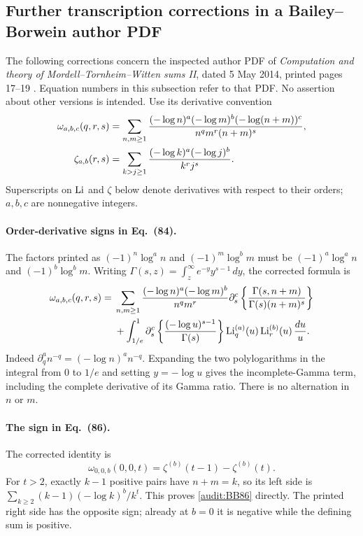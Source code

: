\subsection{Further transcription corrections in a Bailey--Borwein author PDF}
\label{audit:BB2014}

The following corrections concern the inspected author PDF of
\emph{Computation and theory of Mordell--Tornheim--Witten sums II},
dated 5 May 2014, printed pages 17--19 \cite{BB2014}. Equation numbers in
this subsection refer to that PDF. No assertion about other versions
is intended. Use its derivative convention
\begin{align}
 \omega_{a,b,c}(q,r,s)
 &=\sum_{n,m\ge1}
   \frac{(-\log n)^a(-\log m)^b(-\log(n+m))^c}
        {n^q m^r(n+m)^s},\notag\\
 \zeta_{a,b}(r,s)
 &=\sum_{k>j\ge1}\frac{(-\log k)^a(-\log j)^b}{k^rj^s}.
 \label{audit:BB-definitions}
\end{align}
Superscripts on $\operatorname{Li}$ and $\zeta$ below denote derivatives with respect
to their orders; $a,b,c$ are nonnegative integers.

\paragraph{Order-derivative signs in Eq.~(84).}
The factors printed as $(-1)^n\log^a n$ and $(-1)^m\log^b m$
must be $(-1)^a\log^a n$ and $(-1)^b\log^b m$.
Writing $\Gamma(s,z)=\int_z^\infty e^{-y}y^{s-1}\,dy$, the corrected
formula is
\begin{align}
 \omega_{a,b,c}(q,r,s)
 ={}&\sum_{n,m\ge1}\frac{(-\log n)^a(-\log m)^b}{n^q m^r}
     \partial_s^c\left\{
       \frac{\Gamma(s,n+m)}{\Gamma(s)(n+m)^s}\right\}\notag\\
 &+\int_{1/e}^{1}
    \partial_s^c\left\{\frac{(-\log u)^{s-1}}{\Gamma(s)}\right\}
    \operatorname{Li}_q^{(a)}(u)\operatorname{Li}_r^{(b)}(u)\,\frac{du}{u}.
 \label{audit:BB84}
\end{align}
Indeed $\partial_q^a n^{-q}=(-\log n)^a n^{-q}$.
Expanding the two polylogarithms in the integral from $0$ to $1/e$
and setting $y=-\log u$ gives the incomplete-Gamma term, including
the complete derivative of its Gamma ratio. There is no alternation
in $n$ or $m$.

\paragraph{The sign in Eq.~(86).}
The corrected identity is
\begin{equation}
 \omega_{0,0,b}(0,0,t)
 =\zeta^{(b)}(t-1)-\zeta^{(b)}(t).
 \label{audit:BB86}
\end{equation}
For $t>2$, exactly $k-1$ positive pairs have $n+m=k$, so its left
side is $\sum_{k\ge2}(k-1)(-\log k)^b/k^t$. This proves
\eqref{audit:BB86} directly. The printed right side has the opposite
sign; already at $b=0$ it is negative while the defining sum is positive.

